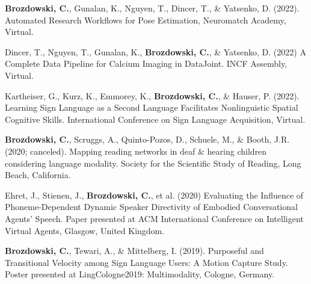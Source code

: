 \par
\begin{cvparagraphlist}
  \textbf{Brozdowski, C.}, Gunalan, K., Nguyen, T., Dincer, T., \& Yatsenko, D. (2022). Automated Research Workflows for Pose Estimation, Neuromatch Academy, Virtual. \par
  Dincer, T., Nguyen, T., Gunalan, K., \textbf{Brozdowski, C.}, \& Yatsenko, D. (2022) A Complete Data Pipeline for Calcium Imaging in DataJoint. INCF Assembly, Virtual. \par
  Kartheiser, G., Kurz, K., Emmorey, K., \textbf{Brozdowski, C.}, \& Hauser, P. (2022). Learning Sign Language as a Second Language Facilitates Nonlinguistic Spatial Cognitive Skills. International Conference on Sign Language Acquisition, Virtual. \par
  \textbf{Brozdowski, C.}, Scruggs, A., Quinto-Pozos, D., Schuele, M., \& Booth, J.R. (2020; canceled). Mapping reading networks in deaf \& hearing children considering language modality. Society for the Scientific Study of Reading, Long Beach, California. \par
  Ehret, J., Stienen, J., \textbf{Brozdowski, C.}, et al. (2020) Evaluating the Influence of Phoneme-Dependent Dynamic Speaker Directivity of Embodied Conversational Agents' Speech. Paper presented at ACM International Conference on Intelligent Virtual Agents, Glasgow, United Kingdom. \par
  \textbf{Brozdowski, C.}, Tewari, A., \& Mittelberg, I. (2019). Purposeful and Transitional Velocity among Sign Language Users: A Motion Capture Study. Poster presented at LingCologne2019: Multimodality, Cologne, Germany. \par
\end{cvparagraphlist}
